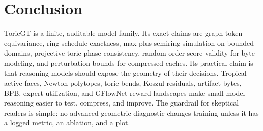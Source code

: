 \documentclass[10pt]{article}
\theoremstyle{definition}
\theoremstyle{plain}
\theoremstyle{remark}
\begin{document}
\section{Conclusion}

ToricGT is a finite, auditable model family.  Its exact claims are graph-token equivariance, ring-schedule exactness, max-plus semiring simulation on bounded domains, projective toric phase consistency, random-order score validity for byte modeling, and perturbation bounds for compressed caches.  Its practical claim is that reasoning models should expose the geometry of their decisions.  Tropical active faces, Newton polytopes, toric bends, Koszul residuals, artifact bytes, BPB, expert utilization, and GFlowNet reward landscapes make small-model reasoning easier to test, compress, and improve.  The guardrail for skeptical readers is simple: no advanced geometric diagnostic changes training unless it has a logged metric, an ablation, and a plot.
\end{document}
